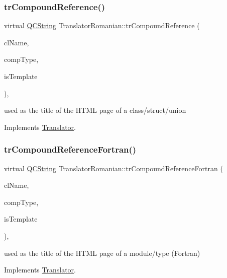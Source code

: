 \subsubsection{\texorpdfstring{trCompoundReference()}{trCompoundReference()}}
{\footnotesize\ttfamily virtual \mbox{\hyperlink{class_q_c_string}{Q\+C\+String}} Translator\+Romanian\+::tr\+Compound\+Reference (\begin{DoxyParamCaption}\item[{const char $\ast$}]{cl\+Name,  }\item[{\mbox{\hyperlink{class_class_def_ae70cf86d35fe954a94c566fbcfc87939}{Class\+Def\+::\+Compound\+Type}}}]{comp\+Type,  }\item[{bool}]{is\+Template }\end{DoxyParamCaption})\hspace{0.3cm}{\ttfamily [inline]}, {\ttfamily [virtual]}}

used as the title of the H\+T\+ML page of a class/struct/union 

Implements \mbox{\hyperlink{class_translator}{Translator}}.

\mbox{\label{class_translator_romanian_a55769e85edeccced8937c06dd28869c9}} 
\subsubsection{\texorpdfstring{trCompoundReferenceFortran()}{trCompoundReferenceFortran()}}
{\footnotesize\ttfamily virtual \mbox{\hyperlink{class_q_c_string}{Q\+C\+String}} Translator\+Romanian\+::tr\+Compound\+Reference\+Fortran (\begin{DoxyParamCaption}\item[{const char $\ast$}]{cl\+Name,  }\item[{\mbox{\hyperlink{class_class_def_ae70cf86d35fe954a94c566fbcfc87939}{Class\+Def\+::\+Compound\+Type}}}]{comp\+Type,  }\item[{bool}]{is\+Template }\end{DoxyParamCaption})\hspace{0.3cm}{\ttfamily [inline]}, {\ttfamily [virtual]}}

used as the title of the H\+T\+ML page of a module/type (Fortran) 

Implements \mbox{\hyperlink{class_translator}{Translator}}.

